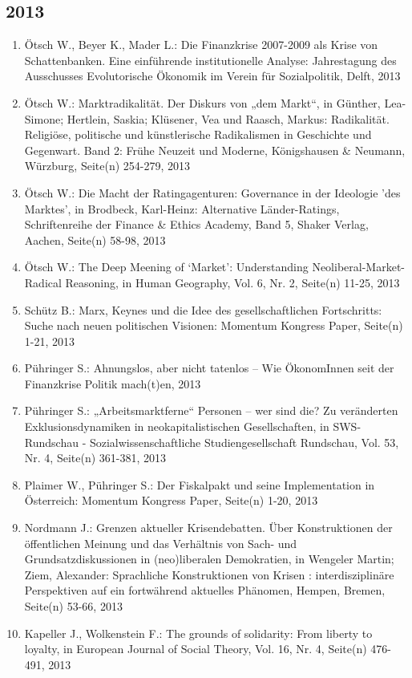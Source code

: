 \subsection*{2013}
\begin{enumerate}
    	 \item Ötsch W., Beyer K., Mader L.: Die Finanzkrise 2007-2009 als Krise von Schattenbanken. Eine einführende institutionelle Analyse: Jahrestagung des Ausschusses Evolutorische Ökonomik im Verein für Sozialpolitik, Delft, 2013
	 \item Ötsch W.: Marktradikalität. Der Diskurs von „dem Markt“, in Günther, Lea-Simone; Hertlein, Saskia;  Klüsener, Vea und Raasch, Markus: Radikalität. Religiöse, politische und künstlerische Radikalismen in Geschichte und Gegenwart.  Band 2: Frühe Neuzeit und Moderne, Königshausen & Neumann, Würzburg, Seite(n) 254-279, 2013
	 \item Ötsch W.: Die Macht der Ratingagenturen: Governance in der Ideologie 'des Marktes', in Brodbeck, Karl-Heinz: Alternative Länder-Ratings, Schriftenreihe der Finance & Ethics Academy, Band 5, Shaker Verlag, Aachen, Seite(n) 58-98, 2013
	 \item Ötsch W.: The Deep Meening of ‘Market’: Understanding Neoliberal-Market-Radical Reasoning, in Human Geography, Vol. 6, Nr. 2, Seite(n) 11-25, 2013
	 \item Schütz B.: Marx, Keynes und die Idee des gesellschaftlichen Fortschritts: Suche nach neuen politischen Visionen: Momentum Kongress Paper, Seite(n) 1-21, 2013
	 \item Pühringer S.: Ahnungslos, aber nicht tatenlos – Wie ÖkonomInnen seit der Finanzkrise Politik mach(t)en, 2013
	 \item Pühringer S.: „Arbeitsmarktferne“ Personen – wer sind die? Zu veränderten Exklusionsdynamiken in neokapitalistischen Gesellschaften, in SWS-Rundschau - Sozialwissenschaftliche Studiengesellschaft Rundschau, Vol. 53, Nr. 4, Seite(n) 361-381, 2013
	 \item Plaimer W., Pühringer S.: Der Fiskalpakt und seine Implementation in Österreich: Momentum Kongress Paper, Seite(n) 1-20, 2013
	 \item Nordmann J.: Grenzen aktueller Krisendebatten. Über Konstruktionen der öffentlichen Meinung und das Verhältnis von Sach- und Grundsatzdiskussionen in (neo)liberalen Demokratien, in Wengeler Martin; Ziem, Alexander: Sprachliche Konstruktionen von Krisen : interdisziplinäre Perspektiven auf ein fortwährend aktuelles Phänomen, Hempen, Bremen, Seite(n) 53-66, 2013
	 \item Kapeller J., Wolkenstein F.: The grounds of solidarity: From liberty to loyalty, in European Journal of Social Theory, Vol. 16, Nr. 4, Seite(n) 476-491, 2013

\end{enumerate}
